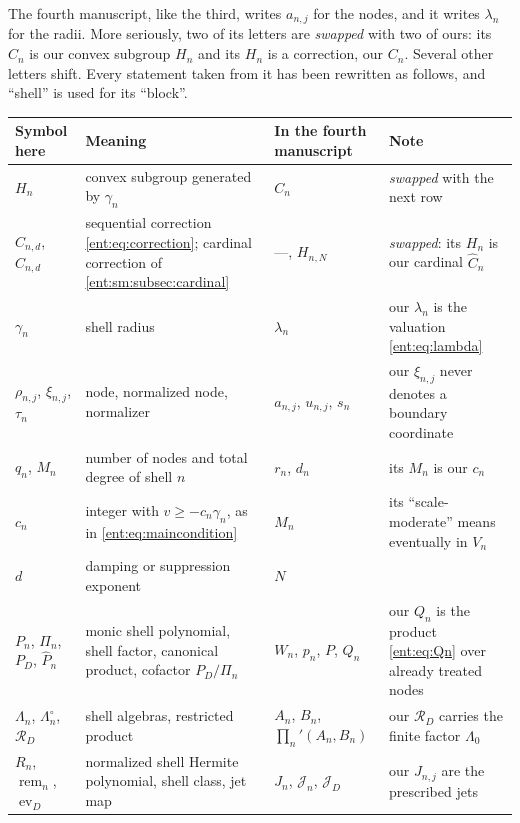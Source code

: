 \documentclass[11pt]{article}
\theoremstyle{plain}
\theoremstyle{plain}
\theoremstyle{plain}
\theoremstyle{definition}
\theoremstyle{definition}
\theoremstyle{definition}
\theoremstyle{definition}
\theoremstyle{remark}
\DeclareMathOperator{\remp}{rem}\DeclareMathOperator{\Res}{Res}
\DeclareMathOperator{\ev}{ev}
\newcommand{\RD}{\mathcal R_D}\newcommand{\Ucal}{\mathcal U}
\begin{document}
The fourth manuscript, like the third, writes $a_{n,j}$ for the nodes, and
it writes $\lambda_n$ for the radii. More seriously, two of its letters are
\emph{swapped} with two of ours: its $C_n$ is our convex subgroup $H_n$ and
its $H_n$ is a correction, our $C_n$. Several other letters shift. Every statement taken from it has been
rewritten as follows, and ``shell'' is used for its ``block''.

\begin{center}\small
\begin{tabularx}{\textwidth}{@{}P{0.2\textwidth}P{0.3\textwidth}P{0.17\textwidth}Y@{}}
\toprule
Symbol here & Meaning & In the fourth manuscript & Note\\\midrule
$H_n$ & convex subgroup generated by $\gamma_n$ & $C_n$ &
\emph{swapped} with the next row\\[0.3em]
$C_{n,d}$, $\widehat C_{n,d}$ & sequential correction \eqref{ent:eq:correction};
cardinal correction of \cref{ent:sm:subsec:cardinal} & ---, $H_{n,N}$ &
\emph{swapped}: its $H_n$ is our cardinal $\widehat C_n$\\[0.3em]
$\gamma_n$ & shell radius & $\lambda_n$ & our $\lambda_n$ is the valuation
\eqref{ent:eq:lambda}\\[0.3em]
$\rho_{n,j}$, $\xi_{n,j}$, $\tau_n$ & node, normalized node, normalizer &
$a_{n,j}$, $u_{n,j}$, $s_n$ & our $\xi_{n,j}$ never denotes a boundary
coordinate\\[0.3em]
$q_n$, $M_n$ & number of nodes and total degree of shell $n$ & $r_n$, $d_n$
& its $M_n$ is our $c_n$\\[0.3em]
$c_n$ & integer with $v\ge-c_n\gamma_n$, as in \eqref{ent:eq:maincondition}
& $M_n$ & its ``scale-moderate'' means eventually in $V_n$\\[0.3em]
$d$ & damping or suppression exponent & $N$ & \\[0.3em]
$P_n$, $\Pi_n$, $P_D$, $\widehat P_n$ & monic shell polynomial, shell factor,
canonical product, cofactor $P_D/\Pi_n$ & $W_n$, $p_n$, $P$, $Q_n$ & our
$Q_n$ is the product \eqref{ent:eq:Qn} over already treated nodes\\[0.3em]
$\Lambda_n$, $\Lambda_n^\circ$, $\RD$ & shell algebras, restricted product
& $A_n$, $B_n$, $\prod_n'(A_n,B_n)$ & our $\RD$ carries the finite factor
$\Lambda_0$\\[0.3em]
$R_n$, $\remp_n$, $\ev_D$ & normalized shell Hermite polynomial, shell class,
jet map & $J_n$, $\mathcal J_n$, $\mathcal J_D$ & our $J_{n,j}$ are the
prescribed jets\\[0.3em]

\end{tabularx}
\end{center}
\end{document}
